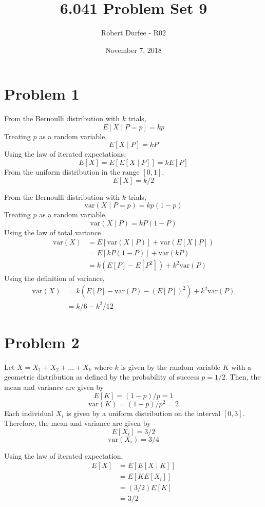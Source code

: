\documentclass{article}
\title{6.041 Problem Set 9}
\author{Robert Durfee - R02}
\date{November 7, 2018}
\begin{document}
\maketitle

\section*{Problem 1}

From the Bernoulli distribution with $k$ trials,
$$ E[X \mid P = p] = k p $$
Treating $p$ as a random variable,
$$ E[X \mid P] = k P $$
Using the law of iterated expectations,
$$ E[X] = E[E[X \mid P]] = k E[P] $$
From the uniform distribution in the range $[0, 1]$,
$$ E[X] = k / 2 $$

From the Bernoulli distribution with $k$ trials,
$$ \mathrm{var}(X \mid P = p) = k p (1 - p) $$
Treating $p$ as a random variable,
$$ \mathrm{var}(X \mid P) = k P (1 - P) $$
Using the law of total variance
\begin{align*}
  \mathrm{var}(X) &= E[\mathrm{var}(X \mid P)] + \mathrm{var}(E[X \mid P]) \\
  &= E[k P(1 - P)] + \mathrm{var}(k P) \\
  &= k(E[P] - E[P^2]) + k^2 \mathrm{var}(P)
\end{align*}
Using the definition of variance,
\begin{align*}
  \mathrm{var}(X) &= k (E[P] - \mathrm{var}(P) - (E[P])^2) + k^2 \mathrm{var}(P) \\
  &= k / 6 - k^2 / 12
\end{align*}

\section*{Problem 2}

Let $X = X_1 + X_2 + \ldots + X_k$ where $k$ is given by the random variable
$K$ with a geometric distribution as defined by the probability of success $p
= 1/2$. Then, the mean and variance are given by
$$ E[K] = (1 - p) / p = 1 $$
$$ \mathrm{var}(K) = (1 - p) / p^2 = 2 $$
Each individual $X_i$ is given by a uniform distribution on the interval $[0,
3]$. Therefore, the mean and variance are given by
$$ E[X_i] = 3 / 2 $$
$$ \mathrm{var}(X_i) = 3 / 4 $$

Using the law of iterated expectation,
\begin{align*}
  E[X] &= E[E[X \mid K]] \\
  &= E[K E[X_i]] \\
  &= (3 / 2) E[K] \\
  &= 3 / 2
\end{align*}
\end{document}
